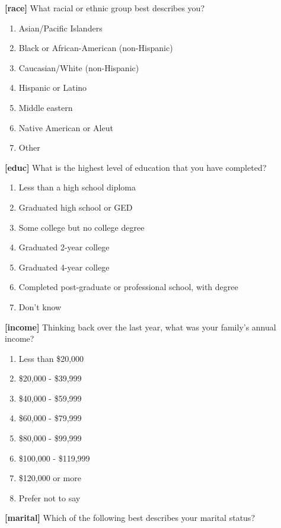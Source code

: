 \documentclass[
]{article}
\providecommand{\tightlist}{%
  \setlength{\itemsep}{0pt}\setlength{\parskip}{0pt}}
\begin{document}
\textbf{{[}race{]}} What racial or ethnic group best describes you?

\begin{enumerate}
\def\labelenumi{\arabic{enumi}.}
\tightlist
\item
  Asian/Pacific Islanders
\item
  Black or African-American (non-Hispanic)
\item
  Caucasian/White (non-Hispanic)
\item
  Hispanic or Latino
\item
  Middle eastern
\item
  Native American or Aleut
\item
  Other
\end{enumerate}

\textbf{{[}educ{]}} What is the highest level of education that you have
completed?

\begin{enumerate}
\def\labelenumi{\arabic{enumi}.}
\tightlist
\item
  Less than a high school diploma
\item
  Graduated high school or GED
\item
  Some college but no college degree
\item
  Graduated 2-year college
\item
  Graduated 4-year college
\item
  Completed post-graduate or professional school, with degree
\item
  Don't know
\end{enumerate}

\textbf{{[}income{]}} Thinking back over the last year, what was your
family's annual income?

\begin{enumerate}
\def\labelenumi{\arabic{enumi}.}
\tightlist
\item
  Less than \$20,000
\item
  \$20,000 - \$39,999
\item
  \$40,000 - \$59,999
\item
  \$60,000 - \$79,999
\item
  \$80,000 - \$99,999
\item
  \$100,000 - \$119,999
\item
  \$120,000 or more
\item
  Prefer not to say
\end{enumerate}

\textbf{{[}marital{]}} Which of the following best describes your
marital status?
\end{document}

